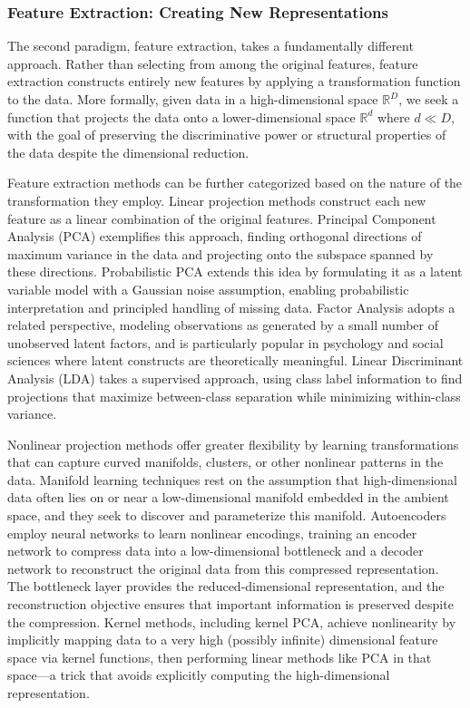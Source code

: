 \subsubsection*{Feature Extraction: Creating New Representations}

The second paradigm, feature extraction, takes a fundamentally different approach. Rather than selecting from among the original features, feature extraction constructs entirely new features by applying a transformation function to the data. More formally, given data in a high-dimensional space $\mathbb{R}^D$, we seek a function that projects the data onto a lower-dimensional space $\mathbb{R}^d$ where $d \ll D$, with the goal of preserving the discriminative power or structural properties of the data despite the dimensional reduction.

Feature extraction methods can be further categorized based on the nature of the transformation they employ. Linear projection methods construct each new feature as a linear combination of the original features. Principal Component Analysis (PCA) exemplifies this approach, finding orthogonal directions of maximum variance in the data and projecting onto the subspace spanned by these directions. Probabilistic PCA extends this idea by formulating it as a latent variable model with a Gaussian noise assumption, enabling probabilistic interpretation and principled handling of missing data. Factor Analysis adopts a related perspective, modeling observations as generated by a small number of unobserved latent factors, and is particularly popular in psychology and social sciences where latent constructs are theoretically meaningful. Linear Discriminant Analysis (LDA) takes a supervised approach, using class label information to find projections that maximize between-class separation while minimizing within-class variance.

Nonlinear projection methods offer greater flexibility by learning transformations that can capture curved manifolds, clusters, or other nonlinear patterns in the data. Manifold learning techniques rest on the assumption that high-dimensional data often lies on or near a low-dimensional manifold embedded in the ambient space, and they seek to discover and parameterize this manifold. Autoencoders employ neural networks to learn nonlinear encodings, training an encoder network to compress data into a low-dimensional bottleneck and a decoder network to reconstruct the original data from this compressed representation. The bottleneck layer provides the reduced-dimensional representation, and the reconstruction objective ensures that important information is preserved despite the compression. Kernel methods, including kernel PCA, achieve nonlinearity by implicitly mapping data to a very high (possibly infinite) dimensional feature space via kernel functions, then performing linear methods like PCA in that space—a trick that avoids explicitly computing the high-dimensional representation.

